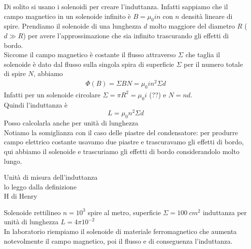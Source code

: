 \begin{examplewt}
	Di solito si usano i solenoidi per creare l'induttanza. Infatti	sappiamo che il campo magnetico in un solenoide infinito è $B=\mu_0 in$ con $n$ densità lineare di spire. Prendiamo il solenoide di una lunghezza $d$ molto maggiore del diametro $R$ ($d\gg R$) per avere l'approssimazione che sia infinito trascurando gli effetti di bordo.\\
	Siccome il campo magnetico è costante il flusso attraverso $\Sigma$ che taglia il solenoide è dato dal flusso sulla singola spira di superficie $\Sigma$ per il numero totale di spire $N$, abbiamo
	\begin{gather*}
		\Phi(B)=\Sigma BN= \mu_0 in^2\Sigma d
	\end{gather*}
	Infatti per un solenoide circolare $\Sigma=\pi R^2=\mu_0i$ (??) e $N=nd$.\\
	Quindi l'induttanza è 
	\begin{equation*}
		L=\mu_0 n^2\Sigma d	
	\end{equation*}
	Posso calcolarla anche per unità di lunghezza %
	\\	Notiamo la somiglianza con il caso delle piastre del condensatore: per produrre campo elettrico costante usavamo due piastre e trascuravamo gli effetti di bordo, qui abbiamo il solenoide e trascuriamo gli effetti di bordo considerandolo molto lungo.
\end{examplewt}

Unità di misura dell'induttanza\\
lo leggo dalla definizione \\
H di Henry\\
\begin{example}
	Solenoide rettilineo $n=10^3$ spire al metro, superficie $\Sigma=100\ cm^2$
	induttanza per unità di lunghezza $L=4\pi 10^{-2}$\\
	In laboratorio riempiamo il solenoide di materiale ferromagnetico che aumenta notevolmente il campo magnetico, poi il flusso e di conseguenza l'induttanza.
\end{example}

